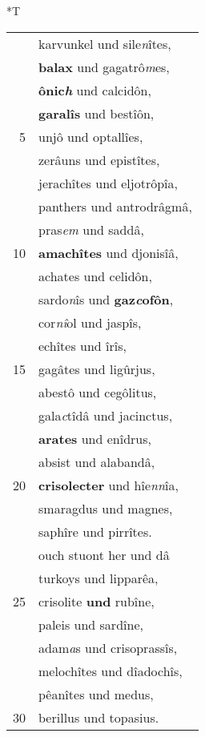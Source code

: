 \documentclass[8pt,a4paper,notitlepage]{article}
\begin{document}
\begin{table}[ht]
\begin{minipage}[t]{0.5\linewidth}
\end{minipage}
\hspace{0.5cm}
\begin{minipage}[t]{0.5\linewidth}
\small
\begin{center}*T
\end{center}
\begin{tabular}{rl}
 & karvunkel und sile\textit{n}îtes,\\ 
 & \textbf{balax} und gagatrô\textit{m}es,\\ 
 & \textbf{ônic\textit{h}} und calcidôn,\\ 
 & \textbf{garalîs} und bestîôn,\\ 
5 & unjô und optallîes,\\ 
 & zerâuns und epistîtes,\\ 
 & jerachîtes und eljotrôpîa,\\ 
 & panthers und antrodrâgmâ,\\ 
 & pras\textit{em} und saddâ,\\ 
10 & \textbf{amachîtes} und djonisîâ,\\ 
 & achates und celidôn,\\ 
 & sardo\textit{n}îs und \textbf{gaz\textit{c}ofôn},\\ 
 & cor\textit{nî}ol und jaspîs,\\ 
 & echîtes und îrîs,\\ 
15 & gagâtes und ligûrjus,\\ 
 & abestô und cegôlitus,\\ 
 & gala\textit{c}tîdâ und jacinctus,\\ 
 & \textbf{arates} und enîdrus,\\ 
 & absist und alabandâ,\\ 
20 & \textbf{crisolecter} und hîe\textit{nn}îa,\\ 
 & smaragdus und magnes,\\ 
 & saphîre und pirrîtes.\\ 
 & ouch stuont her und dâ\\ 
 & turkoys und lipparêa,\\ 
25 & crisolite \textbf{und} rubîne,\\ 
 & paleis und sardîne,\\ 
 & adam\textit{a}s und crisoprassîs,\\ 
 & melochîtes und dîadochîs,\\ 
 & pêanîtes und medus,\\ 
30 & berillus und topasius.\\ 
\end{tabular}

\end{minipage}
\end{table}
\end{document}
